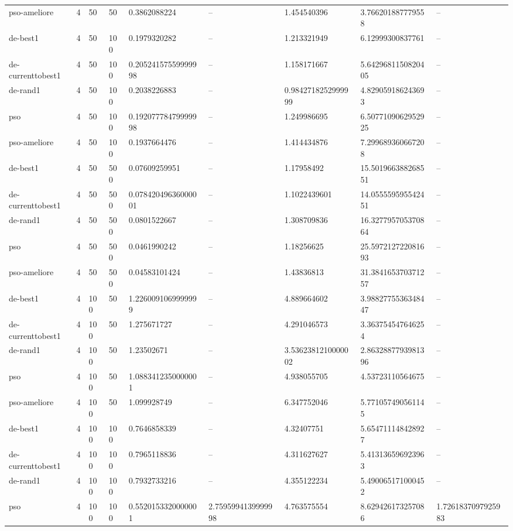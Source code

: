 \begin{table}[t]
\begin{tabular}{lllllllll}
pso-ameliore & 4 & 50 & 50 & 0.3862088224 & -- & 1.454540396 & 3.766201887779558 & -- \\
de-best1 & 4 & 50 & 100 & 0.1979320282 & -- & 1.213321949 & 6.12999300837761 & -- \\
de-currenttobest1 & 4 & 50 & 100 & 0.20524157559999998 & -- & 1.158171667 & 5.6429681150820405 & -- \\
de-rand1 & 4 & 50 & 100 & 0.2038226883 & -- & 0.9842718252999999 & 4.829059186243693 & -- \\
pso & 4 & 50 & 100 & 0.19207778479999998 & -- & 1.249986695 & 6.5077109062952925 & -- \\
pso-ameliore & 4 & 50 & 100 & 0.1937664476 & -- & 1.414434876 & 7.299689360667208 & -- \\
de-best1 & 4 & 50 & 500 & 0.07609259951 & -- & 1.17958492 & 15.501966388268551 & -- \\
de-currenttobest1 & 4 & 50 & 500 & 0.07842049636000001 & -- & 1.1022439601 & 14.055559595542451 & -- \\
de-rand1 & 4 & 50 & 500 & 0.0801522667 & -- & 1.308709836 & 16.327795705370864 & -- \\
pso & 4 & 50 & 500 & 0.0461990242 & -- & 1.18256625 & 25.597212722081693 & -- \\
pso-ameliore & 4 & 50 & 500 & 0.04583101424 & -- & 1.43836813 & 31.384165370371257 & -- \\
de-best1 & 4 & 100 & 50 & 1.2260091069999999 & -- & 4.889664602 & 3.9882775536348447 & -- \\
de-currenttobest1 & 4 & 100 & 50 & 1.275671727 & -- & 4.291046573 & 3.363754547646254 & -- \\
de-rand1 & 4 & 100 & 50 & 1.23502671 & -- & 3.5362381210000002 & 2.8632887793981396 & -- \\
pso & 4 & 100 & 50 & 1.0883412350000001 & -- & 4.938055705 & 4.53723110564675 & -- \\
pso-ameliore & 4 & 100 & 50 & 1.099928749 & -- & 6.347752046 & 5.771057490561145 & -- \\
de-best1 & 4 & 100 & 100 & 0.7646858339 & -- & 4.32407751 & 5.654711148428927 & -- \\
de-currenttobest1 & 4 & 100 & 100 & 0.7965118836 & -- & 4.311627627 & 5.413136596923963 & -- \\
de-rand1 & 4 & 100 & 100 & 0.7932733216 & -- & 4.355122234 & 5.490065171000452 & -- \\
pso & 4 & 100 & 100 & 0.5520153320000001 & 2.7595994139999998 & 4.763575554 & 8.629426173257086 & 1.7261837097925983 \\

\end{tabular}
\end{table}
